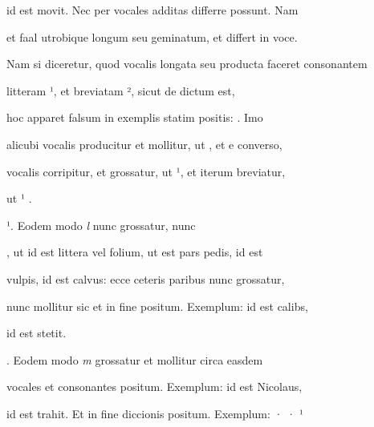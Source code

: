 id est movit. Nec per vocales additas differre possunt. Nam 

et faal utrobique  longum seu geminatum, et  differt in voce.

Nam si diceretur, quod vocalis longata seu producta faceret consonantem



litteram ¹, et breviatam ², sicut de  dictum est,

hoc apparet falsum in exemplis statim positis:  . Imo

alicubi vocalis producitur et  mollitur, ut , et e converso,

vocalis corripitur, et  grossatur, ut ¹, et iterum  breviatur,


\splitlines

ut ¹   .


\indentK {}¹. Eodem modo \textit{l} nunc grossatur, nunc 

\fulllines

, ut  id est littera vel folium,  ut est pars pedis,  id est

vulpis,   id est calvus: ecce ceteris paribus nunc grossatur,

nunc mollitur sic et in fine positum. Exemplum:  id est calibs,

\splitlines

 id est stetit.

\indentK {}. Eodem modo \textit{m} grossatur et mollitur circa easdem

\fulllines

vocales et consonantes positum. Exemplum:  id est Nicolaus,  


id est trahit. Et in fine diccionis positum. Exemplum: · · ¹

